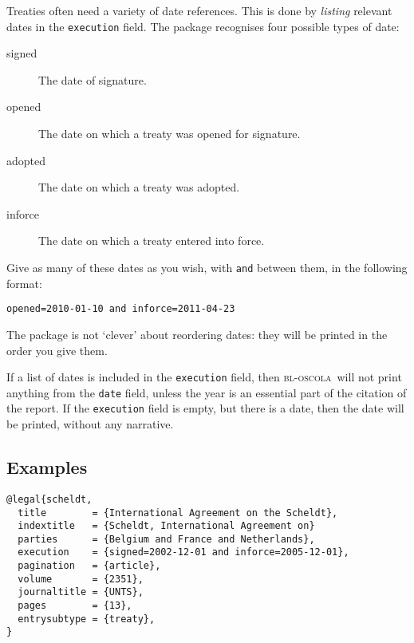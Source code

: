 \documentclass[a5paper,fontsize=9pt,DIV=1]{scrartcl}
\newcommand{\oscola}{\textsc{bl-oscola}}
\newcounter{egcounter}\setcounter{egcounter}{0}
\newenvironment{bibexample}[1][]{%
  \medskip\par\small\noindent\ignorespaces
  \marginpar{[\refstepcounter{egcounter}\arabic{egcounter}]\label{#1}}
  \begin{minipage}[t]{0.95\linewidth}}
 {\end{minipage}\par\medskip}
\begin{document}
Treaties often need a variety of date references. This is done by
\emph{listing} relevant dates in the \texttt{execution} field. The
package recognises four possible types of date: 
\begin{description}
\item[signed]
The date of signature.  
\item[opened] 
The date on which
a treaty was opened for signature.  
\item[adopted] 
The date on which a
treaty was adopted.  
\item[inforce]
The date on which a treaty entered
into force.  
\end{description} 
Give as many of these dates as you
wish, with \texttt{and} between them, in the following format:
\begin{center} \texttt{opened=2010-01-10 and inforce=2011-04-23}
\end{center}

The package is not `clever' about reordering dates: they will be
printed in the order you give them.

If a list of dates is included in the \texttt{execution} field, then
\oscola\ will not print anything from the \texttt{date} field, unless
the year is an essential part of the citation of the report. If the
\texttt{execution} field is empty, but there is a date, then the date
will be printed, without any narrative.

\subsection{Examples}

\begin{bibexample}[scheldt]
\begin{verbatim}
@legal{scheldt,
  title        = {International Agreement on the Scheldt},
  indextitle   = {Scheldt, International Agreement on}
  parties      = {Belgium and France and Netherlands},
  execution    = {signed=2002-12-01 and inforce=2005-12-01},
  pagination   = {article},
  volume       = {2351},
  journaltitle = {UNTS},
  pages        = {13},
  entrysubtype = {treaty},
}
\end{verbatim}
\end{bibexample}
\end{document}
